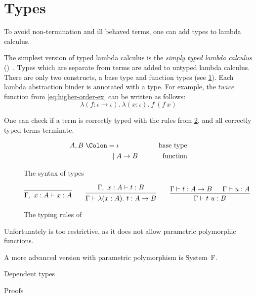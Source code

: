 \section{Types}\label{sec:types}

To avoid non-termination and ill behaved terms, one can add types to lambda
calculus.

The simplest version of typed lambda calculus is the \emph{simply typed lambda
  calculus} ()~\cite{type-Barendregt, type-Pierce, type-Church}.
Types which are separate from terms are added to untyped lambda calculus.
There are only two constructs, a base type and function types (see
\cref{fig:stlc-type-syntax}). Each lambda abstraction binder is annotated with
a type. For example, the \(\mathit{twice}\) function from
\cref{eq:higher-order-ex} can be written as follows:
\begin{equation}
  \lambda (f : \iota \to \iota).\ \lambda (x : \iota).\ f\ (f\ x)
\end{equation}

One can check if a term is correctly typed with the rules from
\cref{fig:stlc-typing}, and all correctly typed terms terminate.

\begin{figure}
  \begin{alignat*}{2}
    A, B \Coleqq{} & \iota   & \qquad\text{base type} \\
    \mid{}         & A \to B & \qquad\text{function}
  \end{alignat*}
  \caption{The syntax of  types}\label{fig:stlc-type-syntax}
\end{figure}

\begin{figure}
  \begin{gather*}
    \begin{prooftree}
      \infer0{\Gamma,\ x : A \vdash x : A}
    \end{prooftree}
    \qquad
    \begin{prooftree}
      \hypo{\Gamma,\ x : A \vdash t : B}
      \infer1{\Gamma \vdash \lambda (x : A).\ t : A \to B}
    \end{prooftree}
    \qquad
    \begin{prooftree}
      \hypo{\Gamma \vdash t : A \to B}
      \hypo{\Gamma \vdash u : A}
      \infer2{\Gamma \vdash t\ u : B }
    \end{prooftree}
  \end{gather*}
  \caption{The typing rules of }\label{fig:stlc-typing}
\end{figure}

Unfortunately  is too restrictive, as it does not allow parametric
polymorphic functions.

A more advanced version with parametric polymorphism is System~F.

Dependent types~\cite{martinloef}

Proofs
